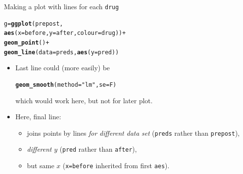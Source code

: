 \documentclass[unknownkeysallowed]{beamer}\usepackage[]{graphicx}\usepackage[]{color}
\makeatletter
\newcommand{\hlstr}[1]{\textcolor[rgb]{0.192,0.494,0.8}{#1}}%
\newcommand{\hlopt}[1]{\textcolor[rgb]{0,0,0}{#1}}%
\newcommand{\hlstd}[1]{\textcolor[rgb]{0.345,0.345,0.345}{#1}}%
\newcommand{\hlkwb}[1]{\textcolor[rgb]{0.69,0.353,0.396}{#1}}%
\newcommand{\hlkwc}[1]{\textcolor[rgb]{0.333,0.667,0.333}{#1}}%
\newcommand{\hlkwd}[1]{\textcolor[rgb]{0.737,0.353,0.396}{\textbf{#1}}}%
\newenvironment{kframe}{%
 \def\at@end@of@kframe{}%
 \ifinner\ifhmode%
  \def\at@end@of@kframe{\end{minipage}}%
  \begin{minipage}{\columnwidth}%
 \fi\fi%
 \def\FrameCommand##1{\hskip\@totalleftmargin \hskip-\fboxsep
 \colorbox{shadecolor}{##1}\hskip-\fboxsep
     \hskip-\linewidth \hskip-\@totalleftmargin \hskip\columnwidth}%
 \MakeFramed {\advance\hsize-\width
   \@totalleftmargin\z@ \linewidth\hsize
   \@setminipage}}%
 {\par\unskip\endMakeFramed%
 \at@end@of@kframe}
\newenvironment{knitrout}{}{} %
\makeatother
\begin{document}
\begin{frame}[fragile]{Making a plot with lines for each \texttt{drug}}

 
\begin{knitrout}
\color{fgcolor}\begin{kframe}
\begin{alltt}
\hlstd{g}\hlkwb{=}\hlkwd{ggplot}\hlstd{(prepost,}
  \hlkwd{aes}\hlstd{(}\hlkwc{x}\hlstd{=before,}\hlkwc{y}\hlstd{=after,}\hlkwc{colour}\hlstd{=drug))}\hlopt{+}
  \hlkwd{geom_point}\hlstd{()}\hlopt{+}
  \hlkwd{geom_line}\hlstd{(}\hlkwc{data}\hlstd{=preds,}\hlkwd{aes}\hlstd{(}\hlkwc{y}\hlstd{=pred))}
\end{alltt}
\end{kframe}
\end{knitrout}


\begin{itemize}
\item Last line could (more easily) be 

\begin{knitrout}
\color{fgcolor}\begin{kframe}
\begin{alltt}
\hlkwd{geom_smooth}\hlstd{(}\hlkwc{method}\hlstd{=}\hlstr{"lm"}\hlstd{,}\hlkwc{se}\hlstd{=F)}
\end{alltt}
\end{kframe}
\end{knitrout}

which would work here, but not for later plot.
\item Here, final line:
  \begin{itemize}
  \item   joins points by lines \emph{for different data
    set} (\texttt{preds} rather than \texttt{prepost}),
\item   \emph{different $y$} (\texttt{pred} rather than \texttt{after}),
  
\item but same $x$ (\texttt{x=before} inherited from first \texttt{aes}).

  \end{itemize}
  
\end{itemize}
  
  
\end{frame}
\end{document}
